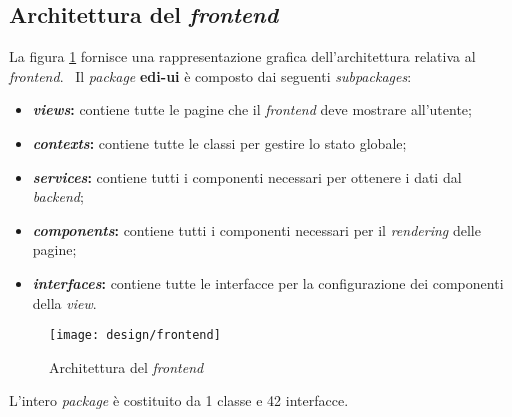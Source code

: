 \subsection{Architettura del \emph{\gls{frontend}}}
La figura \ref{fig:fe-design} fornisce una rappresentazione grafica dell'architettura relativa al \emph{\gls{frontend}}. \
Il \emph{package} \textbf{edi-ui} è composto dai seguenti \emph{subpackages}:
\begin{itemize}
  \item \textbf{\emph{views}:} contiene tutte le pagine che il \emph{\gls{frontend}} deve mostrare all'utente;
  \item \textbf{\emph{contexts}:} contiene tutte le classi per gestire lo stato globale;
  \item \textbf{\emph{services}:} contiene tutti i componenti necessari per ottenere i dati dal \emph{\gls{backend}};
  \item \textbf{\emph{components}:} contiene tutti i componenti necessari per il \emph{rendering} delle pagine;
  \item \textbf{\emph{interfaces}:} contiene tutte le interfacce per la configurazione dei componenti della \emph{view}.
\end{itemize}

\begin{figure}[!ht]
  \begin{center}
    \texttt{[image: design/frontend]}
    \caption{Architettura del \emph{\gls{frontend}}}
    \label{fig:fe-design}
  \end{center}
\end{figure}

L'intero \emph{package} è costituito da 1 classe e 42 interfacce.

